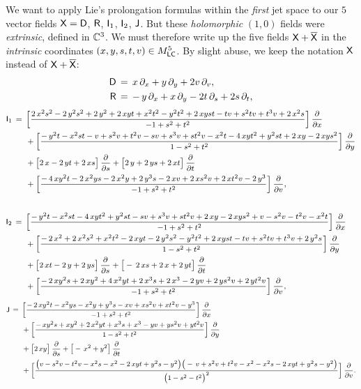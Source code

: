 \documentclass[12pt,twoside,leqno,openany]{amsart}
\begin{document}
We want to apply Lie's prolongation formulas within the {\em first}
jet space to our $5$ vector fields ${\sf X} = {\sf D}$, ${\sf R}$,
${\sf I}_1$, ${\sf I}_2$, ${\sf J}$.  But these {\em holomorphic}
$(1,0)$ fields were {\em extrinsic}, defined in $\mathbb{C}^3$.  We
must therefore write up the five fields ${\sf X} + \overline{\sf X}$
in the {\em intrinsic} coordinates $(x,y,s,t,v) \in M_{\sf LC}^5$.  By
slight abuse, we keep the notation ${\sf X}$ instead of ${\sf X} +
\overline{\sf X}$:
\[
\aligned
{\sf D}
&
\,=\,
x\,\partial_x
+
y\,\partial_y
+
2v\,\partial_v,
\\
{\sf R}
&
\,=\,
-\,y\,\partial_x
+
x\,\partial_y
-
2t\,\partial_s
+
2s\,\partial_t,
\endaligned
\]
\[
\footnotesize
\aligned
{\sf I}_1
&
\,=\,
\Big[
\frac{
2\,x^2s^2-2\,y^2s^2+2\,y^2+2\,xyt+x^2t^2-y^2t^2
+2\,xyst-tv+s^2tv+t^3v+2\,x^2s
}{
-1+s^2+t^2}
\Big]\,
\frac{\partial}{\partial x}
\\
&
\ \ \ \ \
+
\Big[
\frac{-\,y^2t-x^2st-v+s^2v+t^2v-sv+s^3v+st^2v-x^2t-4\,xyt^2
+y^2st+2\,xy-2\,xys^2}
{1-s^2+t^2}
\Big]\,
\frac{\partial}{\partial y}
\\
&
\ \ \ \ \
+
\big[
2\,x-2\,yt+2\,xs
\big]\,
\frac{\partial}{\partial s}
+
\big[
2\,y+2\,ys+2\,xt
\big]\,
\frac{\partial}{\partial t}
\\
&
\ \ \ \ \
+
\Big[
\frac{
-\,4\,xy^2t-2\,x^2ys-2\,x^2y+2\,y^3s-2\,xv+2\,xs^2v
+2\,xt^2v-2\,y^3
}{-1+s^2+t^2}
\Big]\,
\frac{\partial}{\partial v},
\endaligned
\]
\[
\footnotesize
\aligned
\\
{\sf I}_2
&
\,=\,
\Big[
\frac{
-\,y^2t-x^2st-4\,xyt^2+y^2st-sv+s^3v+st^2v+2\,xy
-2\,xys^2+v-s^2v-t^2v-x^2t
}{
-1+s^2+t^2}
\Big]\,
\frac{\partial}{\partial x}
\\
&
\ \ \ \ \
+
\Big[
\frac{
-\,2\,x^2+2\,x^2s^2+x^2t^2-2\,xyt-2\,y^2s^2-y^2t^2
+2\,xyst-tv+s^2tv+t^3v+2\,y^2s
}{1-s^2+t^2}
\Big]\,
\frac{\partial}{\partial y}
\\
&
\ \ \ \ \
+
\big[
2\,xt-2\,y+2\,ys
\big]\,
\frac{\partial}{\partial s}
+
\big[
-\,2\,xs+2\,x+2\,yt
\big]\,
\frac{\partial}{\partial t}
\\
&
\ \ \ \ \
+
\Big[
\frac{
-\,2\,xy^2s+2\,xy^2+4\,x^2yt+2\,x^3s+2\,x^3
-2\,yv+2\,ys^2v+2\,yt^2v
}{-1+s^2+t^2}
\Big]\,
\frac{\partial}{\partial v},
\endaligned
\]
\[
\footnotesize
\aligned
{\sf J}
&
\,=\,
\Big[
\frac{
-\,2\,xy^2t-x^2ys-x^2y+y^3s-xv+xs^2v+xt^2v-y^3
}{
-1+s^2+t^2}
\Big]\,
\frac{\partial}{\partial x}
\\
&
\ \ \ \ \
+
\Big[
\frac{
-\,xy^2s+xy^2+2\,x^2yt+x^3s+x^3-yv+ys^2v+yt^2v
}{1-s^2+t^2}
\Big]\,
\frac{\partial}{\partial y}
\\
&
\ \ \ \ \
+
\big[
2\,xy
\big]\,
\frac{\partial}{\partial s}
+
\big[
-\,x^2+y^2
\big]\,
\frac{\partial}{\partial t}
\\
&
\ \ \ \ \
+
\Big[
\frac{
\big(
v-s^2v-t^2v-x^2s-x^2-2\,xyt+y^2s-y^2
\big)
\big(
-\,v+s^2v+t^2v-x^2-x^2s-2\,xyt+y^2s-y^2
\big)
}{\big(1-s^2-t^2\big)^2}
\Big]\,
\frac{\partial}{\partial v}.
\endaligned
\] 
\end{document}
